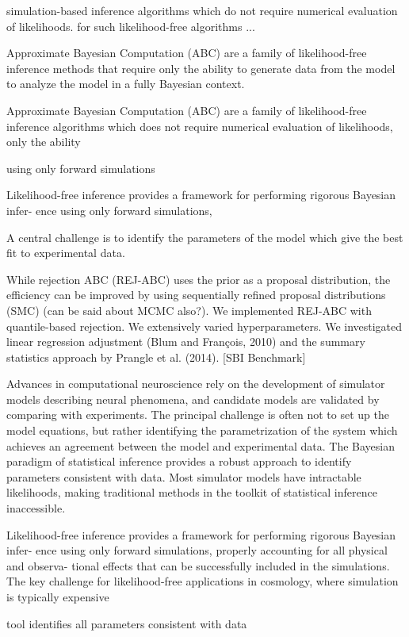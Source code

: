  simulation-based inference algorithms which do not require numerical evaluation of likelihoods. for such likelihood-free algorithms ...

Approximate Bayesian Computation (ABC) are a family of likelihood-free inference methods that require only the ability to generate data from the model to analyze the model in a fully Bayesian context.

Approximate Bayesian Computation (ABC) are a family of likelihood-free inference algorithms which does not require numerical evaluation of likelihoods, only the ability 

using only forward simulations

Likelihood-free inference provides a framework for performing rigorous Bayesian infer- ence using only forward simulations,

A central challenge is to identify the parameters of the model which give the best fit to experimental data. 


While rejection ABC (REJ-ABC) uses the prior as a proposal distribution, the efficiency can be improved by using sequentially refined proposal distributions (SMC) (can be said about MCMC also?). We implemented REJ-ABC with quantile-based rejection. 
We extensively varied hyperparameters. We investigated linear regression adjustment (Blum and François, 2010) and the summary statistics approach
by Prangle et al. (2014). [SBI Benchmark]



Advances in computational neuroscience rely on the development of simulator models describing neural phenomena, and candidate models are validated by comparing with experiments. The principal challenge is often not to set up the model equations, but rather identifying the parametrization of the system which achieves an agreement between the model and experimental data. The Bayesian paradigm of statistical inference provides a robust approach to identify parameters consistent with data. Most simulator models have intractable likelihoods, making traditional methods in the toolkit of statistical inference inaccessible. 


Likelihood-free inference provides a framework for performing rigorous Bayesian infer- ence using only forward simulations, properly accounting for all physical and observa- tional effects that can be successfully included in the simulations. The key challenge for likelihood-free applications in cosmology, where simulation is typically expensive


tool identifies all parameters consistent with data

